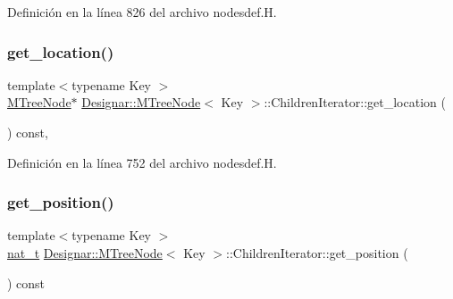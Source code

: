 Definición en la línea 826 del archivo nodesdef.\+H.

\mbox{\label{class_designar_1_1_m_tree_node_1_1_children_iterator_a59d7d79081ab145a9ab886ee4873ae57}} 
\subsubsection{\texorpdfstring{get\+\_\+location()}{get\_location()}}
{\footnotesize\ttfamily template$<$typename Key $>$ \\
\hyperlink{class_designar_1_1_m_tree_node}{M\+Tree\+Node}$\ast$ \hyperlink{class_designar_1_1_m_tree_node}{Designar\+::\+M\+Tree\+Node}$<$ Key $>$\+::Children\+Iterator\+::get\+\_\+location (\begin{DoxyParamCaption}{ }\end{DoxyParamCaption}) const\hspace{0.3cm}{\ttfamily [inline]}, {\ttfamily [protected]}}



Definición en la línea 752 del archivo nodesdef.\+H.

\mbox{\label{class_designar_1_1_m_tree_node_1_1_children_iterator_a0e1a9070e700ca1dbdbc5c588193dd54}} 
\subsubsection{\texorpdfstring{get\+\_\+position()}{get\_position()}}
{\footnotesize\ttfamily template$<$typename Key $>$ \\
\hyperlink{namespace_designar_aa72662848b9f4815e7bf31a7cf3e33d1}{nat\+\_\+t} \hyperlink{class_designar_1_1_m_tree_node}{Designar\+::\+M\+Tree\+Node}$<$ Key $>$\+::Children\+Iterator\+::get\+\_\+position (\begin{DoxyParamCaption}{ }\end{DoxyParamCaption}) const\hspace{0.3cm}{\ttfamily [inline]}}



